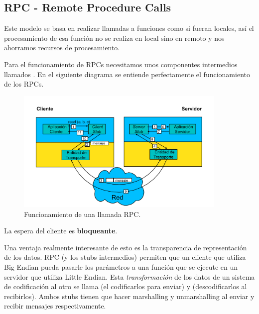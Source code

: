 \subsection{RPC - Remote Procedure Calls}
Este modelo se basa en realizar llamadas a funciones como si fueran locales, así el procesamiento de esa función no se realiza en local sino en remoto y nos ahorramos recursos de procesamiento.

Para el funcionamiento de RPCs necesitamos unos componentes intermedios llamados . En el siguiente diagrama se entiende perfectamente el funcionamiento de los RPCs.
\begin{figure}[htb]
\centering
\includegraphics[width=0.9\textwidth]{img/RPC.png}
\caption{Funcionamiento de una llamada RPC.}
\label{RPCimg}
\end{figure}
\newpage

\obs La espera del cliente es \textbf{bloqueante}.

\obs Una ventaja realmente interesante de esto es la transparencia de representación de los datos. RPC (y los stubs intermedios) permiten que un cliente que utiliza Big Endian pueda pasarle los parámetros a una función que se ejecute en un servidor que utiliza Little Endian. Esta \textit{transformación} de los datos de un sistema de codificación al otro se llama  (el codificarlos para enviar) y  (descodificarlos al recibirlos). Ambos stubs tienen que hacer marshalling y unmarshalling al enviar y recibir mensajes respectivamente.

